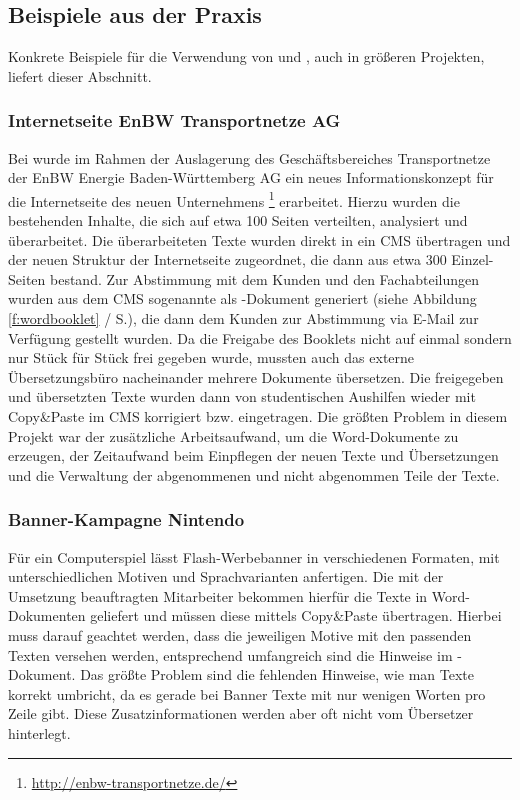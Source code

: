 \subsection{Beispiele aus der Praxis}\label{l:praxisbeispiele}

Konkrete Beispiele für die Verwendung von  und , auch in größeren Projekten, liefert dieser Abschnitt.

\subsubsection{Internetseite EnBW Transportnetze AG}

Bei  wurde im Rahmen der Auslagerung des Geschäftsbereiches Transportnetze der EnBW Energie Baden-Württemberg AG ein neues Informationskonzept für die Internetseite des neuen Unternehmens \footnote{\url{http://enbw-transportnetze.de/}} erarbeitet. Hierzu wurden die bestehenden Inhalte, die sich auf etwa 100 Seiten verteilten, analysiert und überarbeitet. Die überarbeiteten Texte wurden direkt in ein CMS übertragen und der neuen Struktur der Internetseite zugeordnet, die dann aus etwa 300 Einzel-Seiten bestand. Zur Abstimmung mit dem Kunden und den Fachabteilungen wurden aus dem CMS sogenannte  als -Dokument generiert (siehe Abbildung \ref{f:wordbooklet} / S.\pageref{f:wordbooklet}), die dann dem Kunden zur Abstimmung via E-Mail zur Verfügung gestellt wurden. Da die Freigabe des Booklets nicht auf einmal sondern nur Stück für Stück frei gegeben wurde, mussten auch das externe Übersetzungsbüro nacheinander mehrere Dokumente übersetzen. Die freigegeben und übersetzten Texte wurden dann von studentischen Aushilfen wieder mit Copy\&Paste im CMS korrigiert bzw. eingetragen. Die größten Problem in diesem Projekt war der zusätzliche Arbeitsaufwand, um die Word-Dokumente zu erzeugen, der Zeitaufwand beim Einpflegen der neuen Texte und Übersetzungen und die Verwaltung der abgenommenen und nicht abgenommen Teile der Texte.

\subsubsection{Banner-Kampagne Nintendo}

Für ein Computerspiel lässt  Flash-Werbebanner in verschiedenen Formaten, mit unterschiedlichen Motiven und Sprachvarianten anfertigen. Die mit der Umsetzung beauftragten Mitarbeiter bekommen hierfür die Texte in Word-Dokumenten geliefert und müssen diese mittels Copy\&Paste übertragen. Hierbei muss darauf geachtet werden, dass die jeweiligen Motive mit den passenden Texten versehen werden, entsprechend umfangreich sind die Hinweise im -Dokument. Das größte Problem sind die fehlenden Hinweise, wie man Texte korrekt umbricht, da es gerade bei Banner Texte mit nur wenigen Worten pro Zeile gibt. Diese Zusatzinformationen werden aber oft nicht vom Übersetzer hinterlegt.

